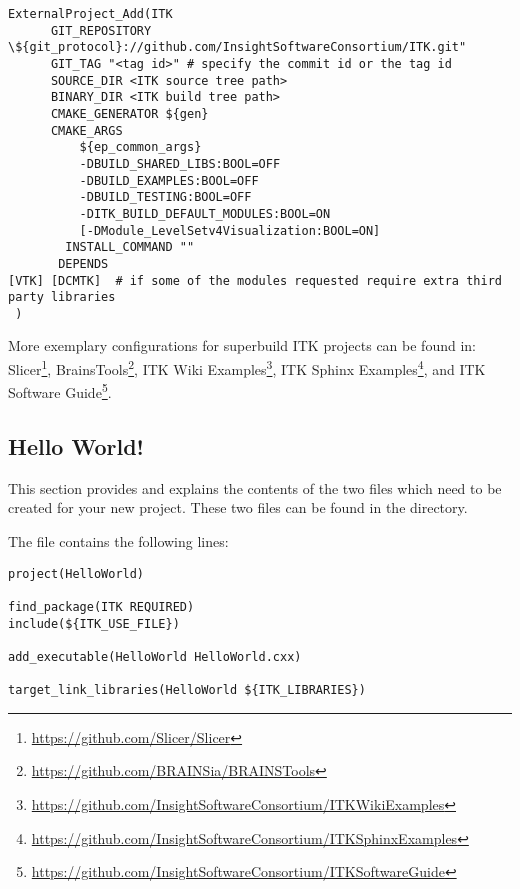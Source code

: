 \small
\begin{verbatim}
ExternalProject_Add(ITK
      GIT_REPOSITORY \${git_protocol}://github.com/InsightSoftwareConsortium/ITK.git"
      GIT_TAG "<tag id>" # specify the commit id or the tag id
      SOURCE_DIR <ITK source tree path>
      BINARY_DIR <ITK build tree path>
      CMAKE_GENERATOR ${gen}
      CMAKE_ARGS
          ${ep_common_args}
          -DBUILD_SHARED_LIBS:BOOL=OFF
          -DBUILD_EXAMPLES:BOOL=OFF
          -DBUILD_TESTING:BOOL=OFF
          -DITK_BUILD_DEFAULT_MODULES:BOOL=ON
          [-DModule_LevelSetv4Visualization:BOOL=ON]
        INSTALL_COMMAND ""
       DEPENDS
[VTK] [DCMTK]  # if some of the modules requested require extra third party libraries
 )
\end{verbatim}
\normalsize

More exemplary configurations for superbuild ITK projects can be found in:
Slicer\footnote{\url{https://github.com/Slicer/Slicer}},
BrainsTools\footnote{\url{https://github.com/BRAINSia/BRAINSTools}}, ITK Wiki
Examples\footnote{\url{https://github.com/InsightSoftwareConsortium/ITKWikiExamples}},
ITK Sphinx
Examples\footnote{\url{https://github.com/InsightSoftwareConsortium/ITKSphinxExamples}},
and ITK Software
Guide\footnote{\url{https://github.com/InsightSoftwareConsortium/ITKSoftwareGuide}}.

\subsection{Hello World!}
\label{sec:HelloWorldITK}


This section provides and explains the contents of the two files which need to
be created for your new project. These two files can be found in the
 directory.

The  file contains the following lines:

\begin{verbatim}
project(HelloWorld)

find_package(ITK REQUIRED)
include(${ITK_USE_FILE})

add_executable(HelloWorld HelloWorld.cxx)

target_link_libraries(HelloWorld ${ITK_LIBRARIES})
\end{verbatim}

